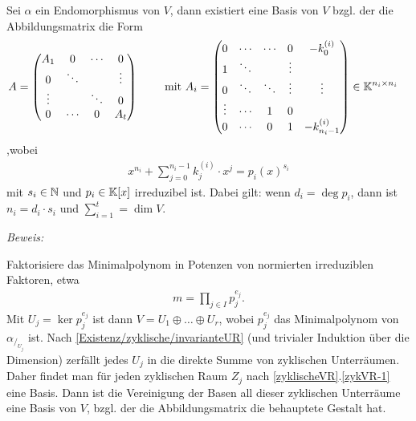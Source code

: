 
\begin{mysatz}\label{kanonischrationaleForm}
Sei $\alpha$ ein Endomorphismus von $V$, dann existiert eine Basis von $V$ bzgl. der die Abbildungsmatrix die Form
\begin{align*}
A & =
\begin{pmatrix}
A_1 & 0 & \cdots & 0\\
0 & \ddots & & \vdots\\
\vdots & & \ddots & 0\\
0 & \cdots & 0 & A_t
\end{pmatrix}
\qquad\text{ mit }
A_i =
\begin{pmatrix}
0 & \cdots & \cdots & 0 & -k_0^{(i)}\\
1 & \ddots & & \vdots &\\
0 & \ddots & \ddots & \vdots & \vdots\\
\vdots & \cdots & 1 & 0 &\\
0 & \cdots & 0 & 1 & -k_{n_i-1}^{(i)}
\end{pmatrix}
\in\mathbb{K}^{n_i \times n_i}
\end{align*}
,wobei
\begin{align*}
x^{n_i} + \sum\limits_{j = 0}^{n_i - 1} k_j^{(i)} \cdot x^j = p_i(x)^{s_i}
\end{align*}
mit $s_i \in \mathbb{N}$ und $p_i \in \mathbb{K}[x]$ irreduzibel ist. Dabei gilt: wenn $d_i = \deg p_i$, dann ist $n_i = d_i \cdot s_i$ und $\sum\limits_{i = 1}^{t}=\dim V$.

\textit{Beweis:}

Faktorisiere das Minimalpolynom in Potenzen von normierten irreduziblen Faktoren, etwa
\begin{align*}
m = \prod\limits_{j \in I} p_j^{e_j}.
\end{align*}
Mit $U_j = \ker p_j^{e_j}$ ist dann $V = U_1 \oplus \ldots \oplus U_r$, wobei $p_j^{e_j}$ das Minimalpolynom von $\alpha_{/_{U_j}}$ ist. 
Nach \ref{Existenz/zyklische/invarianteUR} (und trivialer Induktion über die Dimension) zerfällt jedes $U_j$ in die direkte Summe von zyklischen Unterräumen.
Daher findet man für jeden zyklischen Raum $Z_j$ nach \ref{zyklischeVR}.\ref{zykVR-1} eine Basis.
Dann ist die Vereinigung der Basen all dieser zyklischen Unterräume eine Basis von $V$, bzgl. der die Abbildungsmatrix die behauptete Gestalt hat.
\end{mysatz}

